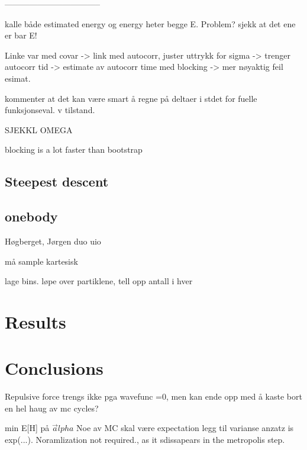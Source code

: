 \documentclass[%
oneside,                 %
final,                   %
10pt]{article}
\begin{document}
-----------------------------------

kalle både estimated energy og energy heter begge E. Problem? sjekk at det ene er bar E!


Linke var med covar -> link med autocorr, juster uttrykk for sigma -> trenger autocorr tid  -> estimate av autocorr time med blocking -> mer nøyaktig feil esimat.

kommenter at det kan være smart å regne på deltaer i stdet for fuelle funksjonseval. v tilstand.


SJEKKL OMEGA

blocking is a lot faster than bootstrap
 
\subsection{Steepest descent} \label{SD}

\subsection{onebody}
Høgberget, Jørgen duo uio

må sample kartesisk

lage bins.
løpe over partiklene, tell opp antall i hver
\section{Results} \label{results}

\section{Conclusions} \label{conclusions}
Repulsive force trengs ikke pga wavefunc =0, men kan ende opp med å kaste bort en hel haug av mc cycles?

min E[H] på $\vec alpha$
Noe av MC skal være expectation
legg til varianse
anzatz is exp(...). Noramlization not required., as it sdissapears in the metropolis step.
 \label{refer}

\end{document}
